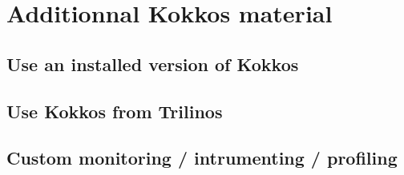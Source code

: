 \documentclass[9pt,hyperref={pdfpagemode=FullScreen,urlcolor=blue},xcolor=x11names]{beamer}
\begin{document}
\section*{Additionnal Kokkos material}

\subsection{Use an installed version of Kokkos}


\subsection{Use Kokkos from Trilinos}


\subsection{Custom monitoring / intrumenting / profiling}

\end{document}
